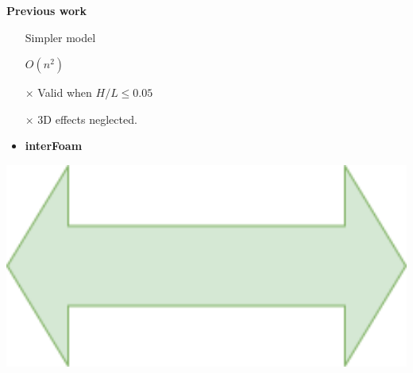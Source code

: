
\begin{frame}
{\Large \textbf{Previous work \cite{mintgen}}}\\[0.5cm]
\hspace{1cm}
\begin{minipage}{0.35\textwidth}
\begin{tcolorbox}[
colframe=TUMDarkestBlue,
colback=TUMDarkBlue!50,
title = \centering SWE\\2D] 
\begin{itemize}
\item[\checkmark] Simpler model 
\item[\checkmark] $O(n^2)$
\item[$\times$] Valid when $H/L \leq 0.05$ %
\item[$\times$] 3D effects neglected. \vspace{0.5cm}
\item<2-> \large \textbf{interFoam}
\end{itemize}
\end{tcolorbox}    
\end{minipage}
\begin{minipage}{0.15\textwidth}
\hspace{0.5cm}
\includegraphics[width=1\textwidth]{Resources/Images/arrow2.png}\\
\end{minipage}
\begin{minipage}{0.35\textwidth}

\end{minipage}
\end{frame}
